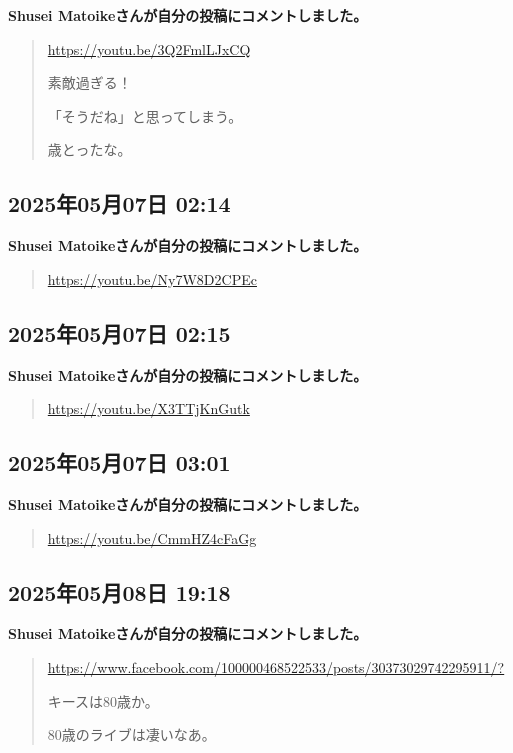 \textbf{Shusei Matoikeさんが自分の投稿にコメントしました。}

\begin{quote}
\url{https://youtu.be/3Q2FmlLJxCQ}

素敵過ぎる！

「そうだね」と思ってしまう。

歳とったな。
\end{quote}

\subsection*{2025年05月07日 02:14}

\textbf{Shusei Matoikeさんが自分の投稿にコメントしました。}

\begin{quote}
\url{https://youtu.be/Ny7W8D2CPEc}
\end{quote}

\subsection*{2025年05月07日 02:15}

\textbf{Shusei Matoikeさんが自分の投稿にコメントしました。}

\begin{quote}
\url{https://youtu.be/X3TTjKnGutk}
\end{quote}

\subsection*{2025年05月07日 03:01}

\textbf{Shusei Matoikeさんが自分の投稿にコメントしました。}

\begin{quote}
\url{https://youtu.be/CmmHZ4cFaGg}
\end{quote}

\subsection*{2025年05月08日 19:18}

\textbf{Shusei Matoikeさんが自分の投稿にコメントしました。}

\begin{quote}
\url{https://www.facebook.com/100000468522533/posts/30373029742295911/?}

キースは80歳か。

80歳のライブは凄いなあ。
\end{quote}

